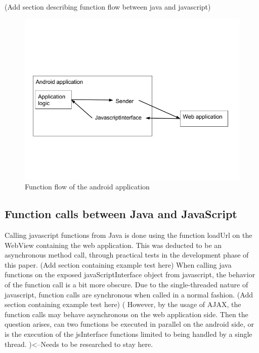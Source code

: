 (Add section describing function flow between java and javascript)

\begin{figure}[ht!]
    \centering
    \includegraphics[width=120mm,natwidth=720,natheight=540]{./img/androidFlow.png}
    \caption{Function flow of the android application\label{caption-android-flow}}
\end{figure}

\subsection {Function calls between Java and JavaScript}
Calling javascript functions from Java is done using the function loadUrl on the WebView containing the web application. This was deducted to be an asynchronous method call, through practical tests in the development phase of this paper. 
\newline\newline
(Add section containing example test here)
\newline\newline
When calling java functions on the exposed javaScriptInterface object from javascript, the behavior of the function call is a bit more obscure. Due to the single-threaded nature of javascript, function calls are synchronous when called in a normal fashion.
\newline\newline
(Add section containing example test here)
\newline\newline
( However, by the usage of AJAX, the function calls may behave asynchronous on the web application side. Then the question arises, can two functions be executed in parallel on the android side, or is the execution of the jsInterface functions limited to being handled by a single thread. )<--Needs to be researched to stay here.

